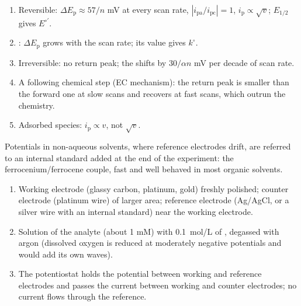 \begin{method}\label{met:b3:electrode-kinetics:cv-diagnosis}
\begin{enumerate}
  \item Reversible: $\Delta E_{\mathrm p} \approx 57/n$ mV at every scan rate, $|i_{\mathrm{pa}}/i_{\mathrm{pc}}| = 1$, $i_{\mathrm p} \propto \sqrt v$;
        $E_{1/2}$ gives $E^{\circ\prime}$.
  \item {}: $\Delta E_{\mathrm p}$ grows with the scan rate; its value gives $k^\circ$.
  \item Irreversible: no return peak; the  shifts by $30/\alpha n$ mV per
        decade of scan rate.
  \item A following chemical step (EC mechanism): the return peak is smaller than
        the forward one at slow scans and recovers at fast scans, which outrun the
        chemistry.
  \item Adsorbed species: $i_{\mathrm p} \propto v$, not $\sqrt v$.
\end{enumerate}
\end{method}

Potentials in non-aqueous solvents, where reference electrodes drift, are
referred to an internal standard added at the end of the experiment: the
ferrocenium/ferrocene couple, fast and well behaved in most organic solvents.

\begin{method}\label{met:b3:electrode-kinetics:three-electrode}
\begin{enumerate}
  \item Working electrode (glassy carbon, platinum, gold) freshly polished;
        counter electrode (platinum wire) of larger area; reference electrode
        (Ag/AgCl, or a silver wire with an internal standard) near the working
        electrode.
  \item Solution of the analyte (about 1 mM) with \qty{0.1}{mol/L} of , degassed with argon (dissolved oxygen is reduced at
        moderately negative potentials and would add its own waves).
  \item The potentiostat holds the potential between working and reference
        electrodes and passes the current between working and counter
        electrodes; no current flows through the reference.
\end{enumerate}
\end{method}

